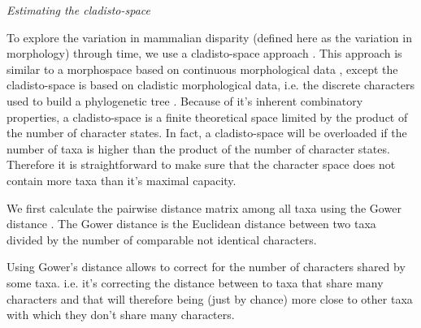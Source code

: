 \documentclass[12pt,letterpaper]{article}
\renewcommand{\subsection}[1]{%
\bigskip
\begin{center}
\begin{large}
\normalfont\itshape #1
\end{large}
\end{center}}
\begin{document}
\subsection{Estimating the cladisto-space} %
To explore the variation in mammalian disparity (defined here as the variation in morphology) through time, we use a cladisto-space approach \citep{Foote01071994,Foote29111996,Wesley-Hunt2005,Brusatte12092008,friedmanexplosive2010,toljagictriassic-jurassic2013}. This approach is similar to a morphospace based on continuous morphological data \citep[e.g.][]{finlay2015morphological}, except the cladisto-space is based on cladistic morphological data, i.e. the discrete characters used to build a phylogenetic tree \citep{Foote01071994,Foote29111996,Wesley-Hunt2005,Brusatte12092008,friedmanexplosive2010,toljagictriassic-jurassic2013}.
Because of it's inherent combinatory properties, a cladisto-space is a finite theoretical space limited by the product of the number of character states. In fact, a cladisto-space will be overloaded if the number of taxa is higher than the product of the number of character states. Therefore it is straightforward to make sure that the character space does not contain more taxa than it's maximal capacity.

We first calculate the pairwise distance matrix among all taxa using the Gower distance \citep{Gower71}. The Gower distance is the Euclidean distance between two taxa divided by the number of comparable not identical characters. 

Using Gower's distance allows to correct for the number of characters shared by some taxa. i.e. it's correcting the distance between to taxa that share many characters and that will therefore being (just by chance) more close to other taxa with which they don't share many characters.
\end{document}
